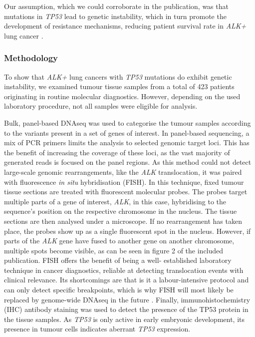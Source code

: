 Our assumption, which we could corroborate in the publication, was that
mutations in \textit{TP53} lead to genetic instability, which in turn promote
the development of resistance mechanisms, reducing patient survival rate in
\textit{ALK+} lung cancer \citep{Alidousty2018}.


\subsubsection{Methodology}\label{subsubsec:alkmethod}
To show that \textit{ALK+} lung cancers with \textit{TP53} mutations do
exhibit genetic instability, we examined tumour tissue samples from a total of
\num{423} patients originating in routine molecular diagnostics. However,
depending on the used laboratory procedure, not all samples were eligible for
analysis.

Bulk, panel-based DNAseq was used to categorise the tumour samples according
to the variants present in a set of genes of interest. In panel-based
sequencing, a mix of PCR primers limits the analysis to selected genomic
target loci. This has the benefit of increasing the coverage of these loci, as
the vast majority of generated reads is focused on the panel regions. As this
method could not detect large-scale genomic rearrangements, like the \textit{%
ALK} translocation, it was paired with fluorescence \textit{in situ}
hybridisation (FISH). In this technique, fixed tumour tissue sections are
treated with fluorescent molecular probes. The probes target multiple parts of
a gene of interest, \textit{ALK}, in this case, hybridising to the sequence's
position on the respective chromosome in the nucleus. The tissue sections are
then analysed under a microscope. If no rearrangement has taken place, the
probes show up as a single fluorescent spot in the nucleus. However, if parts
of the \textit{ALK} gene have fused to another gene on another chromosome,
multiple spots become visible, as can be seen in figure 2 of the included
publication. FISH offers the benefit of being a well- established laboratory
technique in cancer diagnostics, reliable at detecting translocation events
with clinical relevance. Its shortcomings are that is it a labour-intensive
protocol and can only detect specific breakpoints, which is why FISH will most
likely be replaced by genome-wide DNAseq in the future \citep{Skovgaard2011}.
Finally, immunohistochemistry (IHC) antibody staining was used to detect the
presence of the TP53 protein in the tissue samples. As \textit{TP53} is only
active in early embryonic development, its presence in tumour cells indicates
aberrant \textit{TP53} expression.

